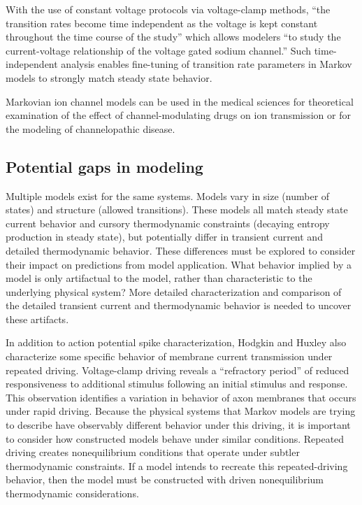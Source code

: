 \documentclass[%
 aip,
 amsmath,amssymb,
 reprint,%
]{revtex4-1}
\begin{document}
With the use of constant voltage protocols via voltage-clamp methods, ``the transition rates become time independent as the voltage is kept constant throughout the time course of the study'' which allows modelers ``to study the current-voltage relationship of the voltage gated sodium channel.''\cite{PAL2016} Such time-independent analysis enables fine-tuning of transition rate parameters in Markov models to strongly match steady state behavior.

Markovian ion channel models can be used in the medical sciences for theoretical examination of the effect of channel-modulating drugs on ion transmission or for the modeling of channelopathic disease.\cite{PAL2016}

\subsection{Potential gaps in modeling}
Multiple models exist for the same systems. Models vary in size (number of states) and structure (allowed transitions). These models all match steady state current behavior and cursory thermodynamic constraints (decaying entropy production in steady state), but potentially differ in transient current and detailed thermodynamic behavior. These differences must be explored to consider their impact on predictions from model application. What behavior implied by a model is only artifactual to the model, rather than characteristic to the underlying physical system? More detailed characterization and comparison of the detailed transient current and thermodynamic behavior is needed to uncover these artifacts.

In addition to action potential spike characterization, Hodgkin and Huxley also characterize some specific behavior of membrane current transmission under repeated driving. Voltage-clamp driving reveals a ``refractory period'' of reduced responsiveness to additional stimulus following an initial stimulus and response. This observation identifies a variation in behavior of axon membranes that occurs under rapid driving. Because the physical systems that Markov models are trying to describe have observably different behavior under this driving, it is important to consider how constructed models behave under similar conditions. Repeated driving creates nonequilibrium conditions that operate under subtler thermodynamic constraints. If a model intends to recreate this repeated-driving behavior, then the model must be constructed with driven nonequilibrium thermodynamic considerations.
\end{document}
